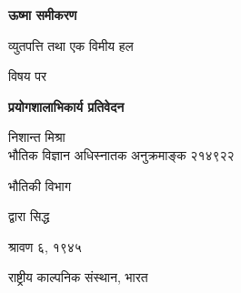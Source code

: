 

\begin{titlepage}
   \begin{center}
        \vspace{4cm}%
        
        {\fontsize{55}{20}\textbf{ऊष्मा समीकरण}}
        
        \vspace{0.5cm}
        \LARGE{व्युतपत्ति तथा एक विमीय हल}
        
        \vspace{2cm}
        \large{विषय पर}

        \vspace{2cm}
        \large\textbf{प्रयोगशालाभिकार्य प्रतिवेदन}


        \vspace{2cm}
        \LARGE{निशान्त मिश्रा \\ \large{भौतिक विज्ञान अधिस्नातक} \break अनुक्रमाङ्क २१४९२२}
         
        
        \vspace{0cm}
        \large{भौतिकी विभाग}


        \vspace{2cm}
        \large{द्वारा सिद्ध}

       
        \vspace{4cm}
        \Large{श्रावण ६, १९४५}
        
        \vfill 
        \Huge{राष्ट्रीय काल्पनिक संस्थान, भारत}
       

      
    \end{center}
\end{titlepage}